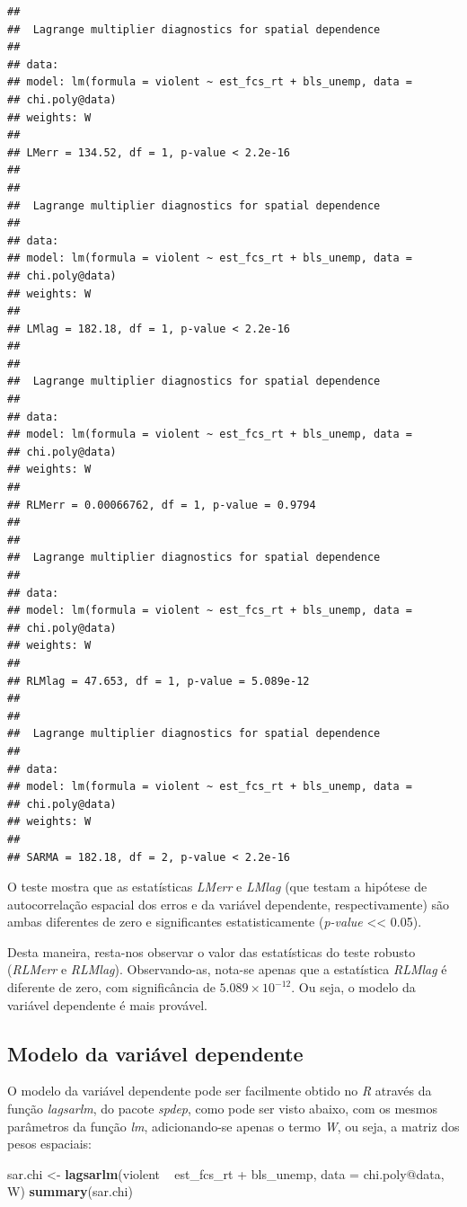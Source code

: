 \documentclass[12pt,]{article}
\newenvironment{Shaded}{\begin{snugshade}}{\end{snugshade}}
\newcommand{\KeywordTok}[1]{\textcolor[rgb]{0.13,0.29,0.53}{\textbf{{#1}}}}
\newcommand{\DataTypeTok}[1]{\textcolor[rgb]{0.13,0.29,0.53}{{#1}}}
\newcommand{\StringTok}[1]{\textcolor[rgb]{0.31,0.60,0.02}{{#1}}}
\newcommand{\NormalTok}[1]{{#1}}
\begin{document}
\begin{verbatim}
## 
##  Lagrange multiplier diagnostics for spatial dependence
## 
## data:  
## model: lm(formula = violent ~ est_fcs_rt + bls_unemp, data =
## chi.poly@data)
## weights: W
## 
## LMerr = 134.52, df = 1, p-value < 2.2e-16
## 
## 
##  Lagrange multiplier diagnostics for spatial dependence
## 
## data:  
## model: lm(formula = violent ~ est_fcs_rt + bls_unemp, data =
## chi.poly@data)
## weights: W
## 
## LMlag = 182.18, df = 1, p-value < 2.2e-16
## 
## 
##  Lagrange multiplier diagnostics for spatial dependence
## 
## data:  
## model: lm(formula = violent ~ est_fcs_rt + bls_unemp, data =
## chi.poly@data)
## weights: W
## 
## RLMerr = 0.00066762, df = 1, p-value = 0.9794
## 
## 
##  Lagrange multiplier diagnostics for spatial dependence
## 
## data:  
## model: lm(formula = violent ~ est_fcs_rt + bls_unemp, data =
## chi.poly@data)
## weights: W
## 
## RLMlag = 47.653, df = 1, p-value = 5.089e-12
## 
## 
##  Lagrange multiplier diagnostics for spatial dependence
## 
## data:  
## model: lm(formula = violent ~ est_fcs_rt + bls_unemp, data =
## chi.poly@data)
## weights: W
## 
## SARMA = 182.18, df = 2, p-value < 2.2e-16
\end{verbatim}

O teste mostra que as estatísticas \emph{LMerr} e \emph{LMlag} (que
testam a hipótese de autocorrelação espacial dos erros e da variável
dependente, respectivamente) são ambas diferentes de zero e
significantes estatisticamente (\emph{p-value} \textless{}\textless{}
0.05).

Desta maneira, resta-nos observar o valor das estatísticas do teste
robusto (\emph{RLMerr} e \emph{RLMlag}). Observando-as, nota-se apenas
que a estatística \emph{RLMlag} é diferente de zero, com significância
de \(5.089\times 10^{-12}\). Ou seja, o modelo da variável dependente é
mais provável.

\subsection{Modelo da variável
dependente}\label{modelo-da-variavel-dependente}

O modelo da variável dependente pode ser facilmente obtido no \emph{R}
através da função \emph{lagsarlm}, do pacote \emph{spdep}, como pode ser
visto abaixo, com os mesmos parâmetros da função \emph{lm},
adicionando-se apenas o termo \emph{W}, ou seja, a matriz dos pesos
espaciais:

\begin{Shaded}
\begin{Highlighting}[]
\NormalTok{sar.chi <-}
\StringTok{  }\KeywordTok{lagsarlm}\NormalTok{(violent ~}\StringTok{ }\NormalTok{est_fcs_rt +}\StringTok{ }\NormalTok{bls_unemp, }\DataTypeTok{data =} \NormalTok{chi.poly@data, W)}
  \KeywordTok{summary}\NormalTok{(sar.chi)}
\end{Highlighting}
\end{Shaded}
\end{document}
